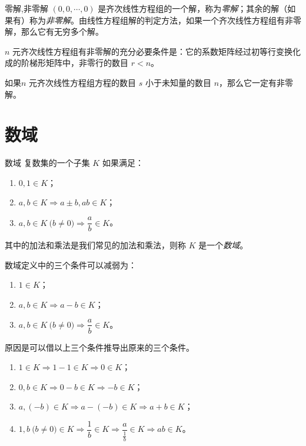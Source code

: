 \begin{definition}{零解,非零解}
	$(0, 0, \cdots, 0)$ 是齐次线性方程组的一个解，称为\emph{零解}；其余的解（如果有）称为\emph{非零解}。由线性方程组解的判定方法，如果一个齐次线性方程组有非零解，那么它有无穷多个解。
\end{definition}

\begin{theorem}
	$n$ 元齐次线性方程组有非零解的充分必要条件是：它的系数矩阵经过初等行变换化成的阶梯形矩阵中，非零行的数目 $r < n$。
\end{theorem}

\begin{theorem}
	如果$n$ 元齐次线性方程组方程的数目 $s$ 小于未知量的数目 $n$，那么它一定有非零解。
\end{theorem}

\section{数域}

\begin{definition}{数域}
	复数集的一个子集 $K$ 如果满足：
	\begin{enumerate}
		\item $0, 1 \in K$；
		\item $a, b \in K \Longrightarrow a \pm b, ab \in K$；
		\item $a, b \in K \pod{b \ne 0} \Longrightarrow \dfrac{a}{b} \in K$。
	\end{enumerate}
	其中的加法和乘法是我们常见的加法和乘法，则称 $K$ 是一个\emph{数域}。
\end{definition}

数域定义中的三个条件可以减弱为：
\begin{enumerate}
	\item $1 \in K$；
	\item $a, b \in K \Longrightarrow a - b \in K$；
	\item $a, b \in K \pod{b \ne 0} \Longrightarrow \dfrac{a}{b} \in K$。
\end{enumerate}

原因是可以借以上三个条件推导出原来的三个条件。
\begin{enumerate}
	\item $1 \in K \Longrightarrow 1 - 1 \in K \Longrightarrow 0 \in K$；
	\item $0, b \in K \Longrightarrow 0 - b \in K \Longrightarrow -b \in K$；
	\item $a, (-b) \in K \Longrightarrow a - (-b) \in K \Longrightarrow a + b \in K$；
	\item $1, b \pod{b \ne 0} \in K \Longrightarrow \dfrac{1}{b} \in K \Longrightarrow \dfrac{a}{\frac{1}{b}} \in K \Longrightarrow ab \in K$。
\end{enumerate}

